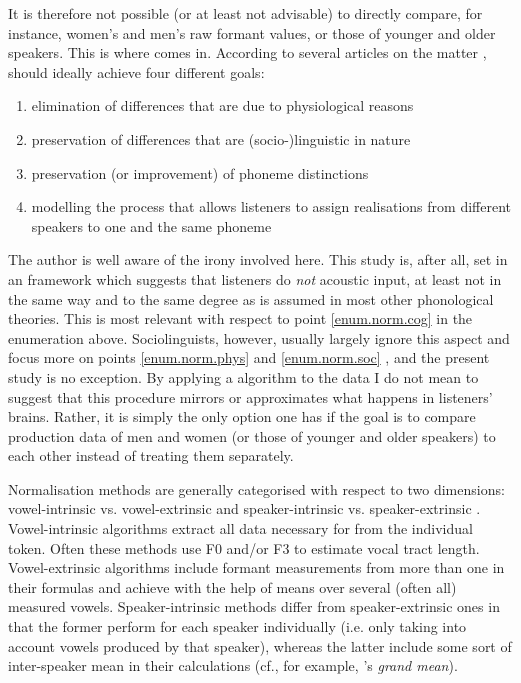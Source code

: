 It is therefore not possible (or at least not advisable) to directly compare, for instance, women's and men's raw formant values, or those of younger and older speakers.
This is where  comes in.
According to several articles on the matter \parencite[cf., for example,][]{fabriciusetal2009,clopper2009,disner1980,kendallthomas2014,thomas2002},  should ideally achieve four different goals:
\begin{enumerate}
	\item \label{enum.norm.phys}elimination of differences that are due to physiological reasons
	\item \label{enum.norm.soc}preservation of differences that are (socio-)linguistic in nature
	\item \label{enum.norm.phon}preservation (or improvement) of phoneme distinctions
	\item \label{enum.norm.cog}modelling the process that allows listeners to assign realisations from different speakers to one and the same phoneme
\end{enumerate}
The author is well aware of the irony involved here.
This study is, after all, set in an  framework which suggests that listeners do \emph{not}  acoustic input, at least not in the same way and to the same degree as is assumed in most other phonological theories.
This is most relevant with respect to point \ref{enum.norm.cog} in the enumeration above. Sociolinguists, however, usually largely ignore this aspect and focus more on points \ref{enum.norm.phys} and \ref{enum.norm.soc} \parencites(cf.)()[1430]{clopper2009}[414--415]{fabriciusetal2009}{kendallthomas2014}, and the present study is no exception.
By applying a  algorithm to the data I do not mean to suggest that this procedure mirrors or approximates what happens in listeners' brains.
Rather, it is simply the only option one has if the goal is to compare production data of men and women (or those of younger and older speakers) to each other instead of treating them separately.

Normalisation methods are generally categorised with respect to two dimensions: vowel-intrinsic vs. vowel-extrinsic and speaker-intrinsic vs. speaker-extrinsic \parencite[cf.][]{kendallthomas2014}.
Vowel-intrinsic algorithms extract all data necessary for  from the individual token.
Often these methods use F0 and/or F3 to estimate vocal tract length.
Vowel-extrinsic algorithms include formant measurements from more than one  in their formulas and achieve  with the help of means over several (often all) measured vowels.
Speaker-intrinsic methods differ from speaker-extrinsic ones in that the former perform  for each speaker individually (i.e. only taking into account vowels produced by that speaker), whereas the latter include some sort of inter-speaker mean in their calculations (cf., for example, \textcite{labovetal2006}'s \emph{grand mean}).

